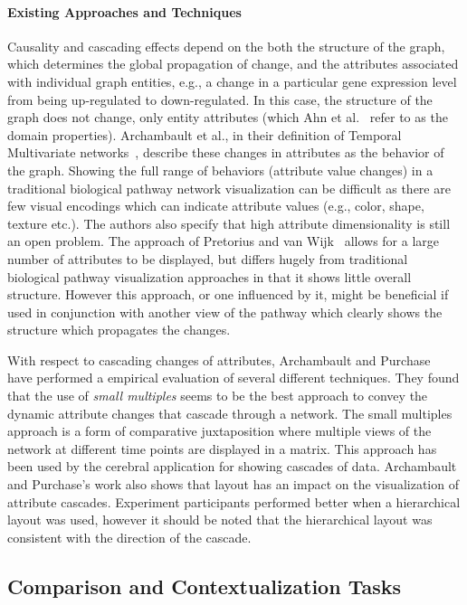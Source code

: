 \documentclass[twocolumn]{bmcart}%
\begin{document}
\paragraph*{Existing Approaches and Techniques}

Causality and cascading effects depend on the both the structure of the graph, which determines the global propagation of change, and the attributes associated with individual graph entities, e.g., a change in a particular gene expression level from being up-regulated to down-regulated.
In this case, the structure of the graph does not change, only entity attributes (which Ahn et al.~\cite{Ahn2014} refer to as the domain properties).
Archambault et al., in their definition of Temporal Multivariate networks~\cite{archambault2014temporal}, describe these changes in attributes as the behavior of the graph.
Showing the full range of behaviors (attribute value changes) in a traditional biological pathway network visualization  can be difficult as there are few visual encodings which can indicate attribute values (e.g., color, shape, texture etc.).
The authors also specify that high attribute dimensionality is still an open problem.
The approach of Pretorius and van Wijk~\cite{pretorius2008} allows for a large number of attributes to be displayed, but differs hugely from traditional biological pathway visualization approaches in that it shows little overall structure.
However this approach, or one influenced by it, might be beneficial if used in conjunction with another view of the pathway which clearly shows the structure which propagates the changes.

With respect to cascading changes of attributes, Archambault and Purchase~\cite{Archambault2016} have performed a empirical evaluation of several different techniques.
They found that the use of \emph{small multiples} seems to be the best approach to convey the dynamic attribute changes that cascade through a network.
The small multiples approach is a form of comparative juxtaposition where multiple views of the network at different time points are displayed in a matrix.
This approach has been used by the cerebral application for showing cascades of data.
Archambault and Purchase's work also shows that layout has an impact on the visualization of attribute cascades.
Experiment participants performed better when a hierarchical layout was used, however it should be noted that the hierarchical layout was consistent with the direction of the cascade.

\subsection*{Comparison and Contextualization Tasks}
\end{document}

